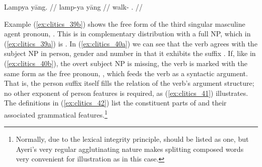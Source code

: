 \a\label{ex:clitics_41b}\ljudge{*}\begingl
	\gla Lampya yāng. //
	\glb lamp-ya yāng //
	\glc walk-\TsgM{} \TsgM{}.\Aarg{} //
\endgl
\xe

Example (\ref{ex:clitics_39b}) shows the free form of the third singular
masculine agent pronoun, . This is in complementary
distribution with a full NP, which in (\ref{ex:clitics_39a}) is . In (\ref{ex:clitics_40a}) we can see that the verb agrees
with the subject NP in person, gender and number in that it exhibits the suffix
. If, like in (\ref{ex:clitics_40b}), the overt subject NP is
missing, the verb is marked with the same form as the free pronoun,
, which feeds the verb as a syntactic argument. That is,
the person suffix itself fills the  \Subj{} relation of the verb's argument
structure; no other exponent of person features is required, as
(\ref{ex:clitics_41}) illustrates. The definitions in (\ref{ex:clitics_42})
list the constituent parts of  and their
associated grammatical features.\footnote{Normally, due to the lexical
integrity principle,  should be listed as one, but
Ayeri's very regular agglutinating nature makes splitting composed words very
convenient for illustration as in this case.}

